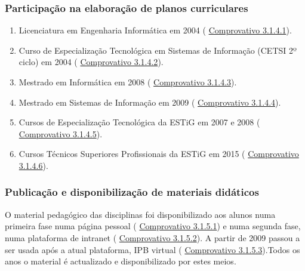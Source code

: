\documentclass[11pt]{article}
\begin{document}
\subsubsection{Participação na elaboração de planos curriculares}
\begin{enumerate}
\item{Licenciatura em Engenharia Informática em 2004 (
\href{run:MissaoIPBoutros/desenhoCursos.pdf}{Comprovativo 3.1.4.1}).}
\item{Curso de Especialização Tecnológica em Sistemas de Informação (CETSI 2º ciclo) em 2004 (
\href{run:MissaoIPBoutros/desenhoCursos.pdf}{Comprovativo 3.1.4.2}).}
\item{Mestrado em Informática em 2008 (
\href{run:MissaoIPBoutros/desenhoCursos.pdf}{Comprovativo 3.1.4.3}).}
\item{Mestrado em Sistemas de Informação em 2009 (
\href{run:MissaoIPBoutros/desenhoCursos.pdf}{Comprovativo 3.1.4.4}).}
\item{Cursos de Especialização Tecnológica da ESTiG em 2007 e 2008 (
\href{run:MissaoIPBCargos/tarefasSub.pdf}{Comprovativo 3.1.4.5}).}
\item{Cursos Técnicos Superiores Profissionais da ESTiG em 2015 (
\href{run:MissaoIPBCargos/tarefasSub.pdf}{Comprovativo 3.1.4.6}).}
\end{enumerate}
\subsubsection{Publicação e disponibilização de materiais didáticos}O material pedagógico das disciplinas foi disponibilizado aos alunos numa primeira fase numa página pessoal (
\href{run:Virtual/usoPagPessoal.pdf}{Comprovativo 3.1.5.1}) e numa segunda fase, numa plataforma de intranet (
\href{run:Virtual/intranet.pdf}{Comprovativo 3.1.5.2}). A partir de 2009 passou a ser usada após a atual plataforma, IPB virtual (
\href{run:Virtual/usoIPBVirtual.pdf}{Comprovativo 3.1.5.3}).Todos os anos o material é actualizado e disponibilizado por estes meios.
\end{document}
